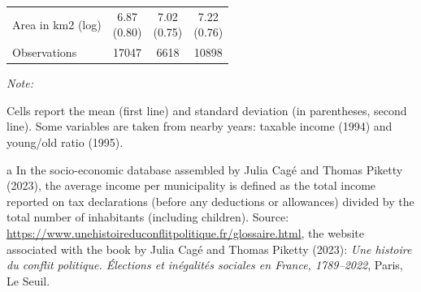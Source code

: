 \begin{table}[!h]
{\begin{threeparttable}
\begin{tabular}[t]{>{\raggedright\arraybackslash}p{7cm}ccc}
\hspace{1em}Area in km2 (log) & \makecell{6.87 \\ (0.80)} & \makecell{7.02 \\ (0.75)} & \makecell{7.22 \\ (0.76)}\\
\hspace{1em}Observations & 17047 & 6618 & 10898\\
\bottomrule
\end{tabular}
\begin{tablenotes}
\item \textit{Note: } 
\item Cells report the mean (first line) and standard deviation (in parentheses, second line). Some variables are taken from nearby years: taxable income (1994) and young/old ratio (1995).
\item[a] In the socio-economic database assembled by Julia Cag\'e and Thomas Piketty (2023), the average income per municipality is defined as the total income reported on tax declarations (before any deductions or allowances) divided by the total number of inhabitants (including children). Source: \url{https://www.unehistoireduconflitpolitique.fr/glossaire.html}, the website associated with the book by Julia Cag\'e and Thomas Piketty (2023): \textit{Une histoire du conflit politique. \'{E}lections et in\'{e}galit\'{e}s sociales en France, 1789--2022}, Paris, Le Seuil.
\end{tablenotes}
\end{threeparttable}}
\end{table}
